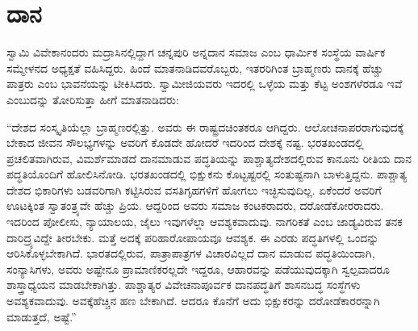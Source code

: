 
\chapter{ದಾನ}

\vskip 5pt

ಸ್ವಾಮಿ ವಿವೇಕಾನಂದರು ಮದ್ರಾಸಿನಲ್ಲಿದ್ದಾಗ ಚನ್ನಪುರಿ ಅನ್ನದಾನ ಸಮಾಜ ಎಂಬ ಧಾರ್ಮಿಕ ಸಂಸ್ಥೆಯ ವಾರ್ಷಿಕ ಸಮ್ಮೇಳನದ ಅಧ್ಯಕ್ಷತೆ ವಹಿಸಿದ್ದರು. ಹಿಂದೆ ಮಾತನಾಡಿದವರೊಬ್ಬರು, ಇತರರಿಗಿಂತ ಬ್ರಾಹ್ಮಣರು ದಾನಕ್ಕೆ ಹೆಚ್ಚು ಪಾತ್ರರು ಎಂಬ ಭಾವನೆಯನ್ನು ಟೀಕಿಸಿದರು. ಸ್ವಾಮೀಜಿಯವರು ಇದರಲ್ಲಿ ಒಳ್ಳೆಯ ಮತ್ತು ಕೆಟ್ಟ ಅಂಶಗಳೆರಡೂ ಇವೆ ಎಂಬುದನ್ನು ತೋರಿಸುತ್ತಾ ಹೀಗೆ ಮಾತನಾಡಿದರು:

\vskip 3pt

“ದೇಶದ ಸಂಸ್ಕೃತಿಯೆಲ್ಲಾ ಬ್ರಾಹ್ಮಣರಲ್ಲಿತ್ತು. ಅವರು ಈ ರಾಷ್ಟ್ರದ\break ಚಿಂತಕರೂ ಆಗಿದ್ದರು. ಆಲೋಚನಾಪರರಾಗುವುದಕ್ಕೆ ಬೇಕಾದ ಜೀವನ ಸೌಲಭ್ಯಗಳನ್ನು ಅವರಿಗೆ ಕೊಡದೇ ಹೋದರೆ ಇದರಿಂದ ದೇಶಕ್ಕೆ ನಷ್ಟ. ಭರತಖಂಡದಲ್ಲಿ ಪ್ರಚಲಿತವಾಗಿರುವ, ವಿಮರ್ಶೆಮಾಡದೆ ದಾನಮಾಡುವ ಪದ್ಧತಿಯನ್ನು ಪಾಶ್ಚಾತ್ಯದೇಶದಲ್ಲಿರುವ ಕಾನೂನು ರೀತಿಯ ದಾನ ಪದ್ಧತಿಯೊಂದಿಗೆ ಹೋಲಿಸಿನೋಡಿ. ಭರತಖಂಡದಲ್ಲಿ ಭಿಕ್ಷುಕನು ಕೊಟ್ಟಷ್ಟರಲ್ಲಿ ಸಂತುಷ್ಟನಾಗಿ ಬಾಳುತ್ತಿದ್ದನು. ಪಾಶ್ಚಾತ್ಯ ದೇಶದ ಭಿಕಾರಿಗಳು ಬಡವರಿಗಾಗಿ ಕಟ್ಟಿಸಿರುವ ವಸತಿಗೃಹಗಳಿಗೆ ಹೋಗಲು ಇಚ್ಛಿಸುವುದಿಲ್ಲ. ಏಕೆಂದರೆ ಅವರಿಗೆ ಊಟಕ್ಕಿಂತ ಸ್ವಾತಂತ್ರ್ಯವೇ ಹೆಚ್ಚು ಪ್ರಿಯ. ಆದ್ದರಿಂದ ಅವರು ಸಮಾಜ ಕಂಟಕರಾದರು, ದರೋಡೆಕೋರರಾದರು. ಇದರಿಂದ ಪೋಲೀಸು, ನ್ಯಾಯಾಲಯ, ಜೈಲು ಇವುಗಳೆಲ್ಲಾ ಆವಶ್ಯಕವಾದುವು. ನಾಗರಿಕತೆ ಎಂಬ ಜಾಡ್ಯವಿರುವ ತನಕ ದಾರಿದ್ರ್ಯವಿದ್ದೇ ತೀರಬೇಕು. ಮತ್ತೆ ಅದಕ್ಕೆ ಪರಿಹಾರೋಪಾಯವೂ ಆವಶ್ಯಕ. ಈ ಎರಡು ಪದ್ಧತಿಗಳಲ್ಲಿ ಒಂದನ್ನು ಆರಿಸಿಕೊಳ್ಳಬೇಕಾಗಿದೆ. ಭಾರತದಲ್ಲಿರುವ, ಪಾತ್ರಾಪಾತ್ರಗಳ ವಿಚಾರವಿಲ್ಲದೆ ದಾನ ಮಾಡುವ ಪದ್ಧತಿಯಿಂದಾಗಿ, ಸಂನ್ಯಾಸಿಗಳು, ಅವರು ಅಷ್ಟೇನೂ ಪ್ರಾಮಾಣಿಕರಲ್ಲದೇ ಇದ್ದರೂ, ಆಹಾರವನ್ನು ಪಡೆಯುವುದಕ್ಕಾಗಿ ಸ್ವಲ್ಪವಾದರೂ ಶಾಸ್ತ್ರಾಧ್ಯಯನ ಮಾಡಬೇಕಾಗಿತ್ತು. ಪಾಶ್ಚಾತ್ಯರ ವಿವೇಚನಾಪೂರ್ವಕ ದಾನಪದ್ಧತಿಗೆ ಶಾಸನಬದ್ಧ ಸಂಸ್ಧೆಗಳು ಅವಶ್ಯಕವಾದುವು. ಅವಕ್ಕೆ\break ಹೆಚ್ಚಿನ ಹಣ ಬೇಕಾಗಿದೆ. ಆದರೂ ಕೊನೆಗೆ ಅದು ಭಿಕ್ಷುಕರನ್ನು ದರೋಡೆ\-ಕಾರರನ್ನಾಗಿ ಮಾಡುತ್ತದೆ, ಅಷ್ಟೆ.”

